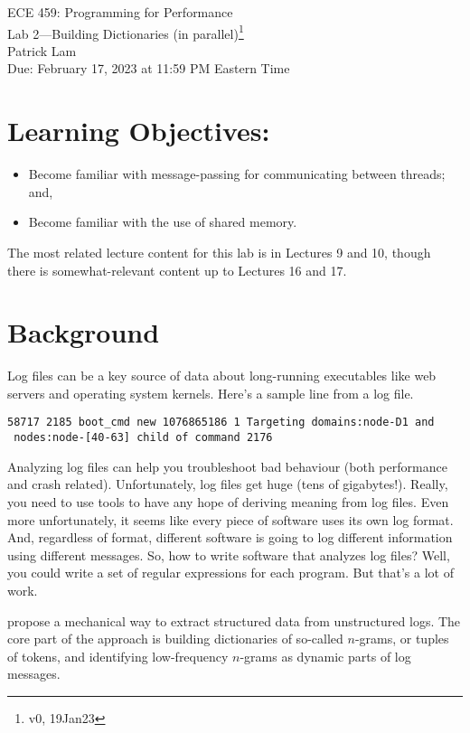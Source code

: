 \documentclass[12pt]{article}
\renewcommand{\_}{\kern-1.5pt\textunderscore\kern-1.5pt}
\begin{document}
\begin{center}
{\Large ECE 459: Programming for Performance}\\
{\Large Lab 2---Building Dictionaries (in parallel)\footnote{v0, 19Jan23}}\\[1em]
Patrick Lam\\
Due: February 17, 2023 at 11:59 PM Eastern Time
\end{center}

\section*{Learning Objectives:}

\begin{itemize}[noitemsep]
	\item Become familiar with message-passing for communicating between threads; and,
	\item Become familiar with the use of shared memory.
\end{itemize}

The most related lecture content for this lab is in Lectures 9 and 10, though there is somewhat-relevant content up to Lectures 16 and 17. 

\section*{Background}
Log files can be a key source of data about long-running executables like web servers and operating system kernels. Here's a sample line from a log file.

\begin{verbatim}
58717 2185 boot_cmd new 1076865186 1 Targeting domains:node-D1 and
 nodes:node-[40-63] child of command 2176
\end{verbatim}

Analyzing log files can help you troubleshoot bad behaviour (both performance and crash related). Unfortunately, log files get huge (tens of gigabytes!). Really, you need to use tools to have any hope of deriving meaning from log files. Even more unfortunately, it seems like every piece of software uses its own log format. And, regardless of format, different software is going to log different information using different messages. So, how to write software that analyzes log files? Well, you could write a set of regular expressions for each program. But that's a lot of work.

\cite{dai22} propose a mechanical way to extract structured data from unstructured logs. The core part of the approach is building dictionaries of so-called $n$-grams, or tuples of tokens, and identifying low-frequency $n$-grams as dynamic parts of log messages.
\end{document}
